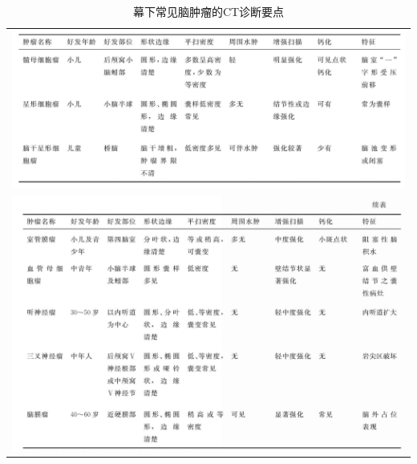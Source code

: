 \begin{longtable}{c}
  \caption{幕下常见脑肿瘤的CT诊断要点}
  \label{tab2-8}\\
  \endfirsthead
  \caption[]{幕下常见脑肿瘤的CT诊断要点}
  \endhead
\includegraphics[width=\textwidth,height=\textheight,keepaspectratio]{./images/Image00087.jpg}\\
\includegraphics[width=\textwidth,height=\textheight,keepaspectratio]{./images/Image00088.jpg}
\end{longtable}



